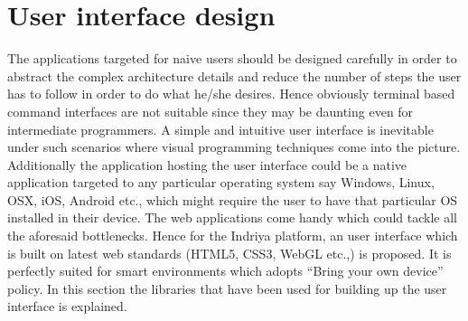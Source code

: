 % 
\section{User interface design}
\label{sec:ui_design}
The applications targeted for naive users should be designed carefully in order to abstract the complex architecture details and reduce the number of steps the user has to follow in order to do what he/she desires. Hence obviously terminal based command interfaces are not suitable since they may be daunting even for intermediate programmers. A simple and intuitive user interface is inevitable under such scenarios where visual programming techniques come into the picture. Additionally the application hosting the user interface could be a native application targeted to any particular operating system say Windows, Linux, OSX, iOS, Android etc., which might require the user to have that particular OS installed in their device. The web applications come handy which could tackle all the aforesaid bottlenecks. Hence for the Indriya platform, an user interface which is built on latest web standards (HTML5, CSS3, WebGL etc.,) is proposed. It is perfectly suited for smart environments which adopts ``Bring your own device'' policy. In this section the libraries that have been used for building up the user interface is explained.
